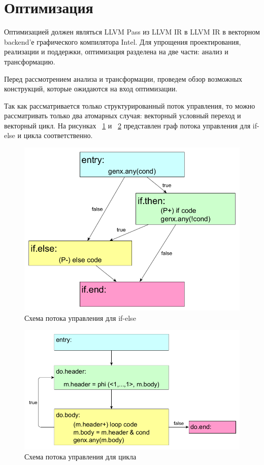 \section{Оптимизация}
\label{sec:Optimization}

Оптимизацией должен являться LLVM Pass из LLVM IR в LLVM IR в векторном
backend'е графического компилятора Intel. Для упрощения проектирования,
реализации и поддержки, оптимизация разделена на две части: анализ и
трансформацию.

Перед рассмотрением анализа и трансформации, проведем обзор возможных
конструкций, которые ожидаются на вход оптимизации.

Так как рассматривается только структурированный поток управления, то можно
рассматривать только два атомарных случая: векторный условный переход и
векторный цикл. На рисунках ~\ref{fig:if-else-simdcf-simple} и
~\ref{fig:loop-simdcf-simple} представлен граф потока управления для if-else и
цикла соответственно.
\begin{figure}
  \centering
  \includegraphics[scale=0.27]{Images/if-else-FE-colored.png}
  \caption{Схема потока управления для if-else}
  \label{fig:if-else-simdcf-simple}
\end{figure}
\begin{figure}
  \centering
  \includegraphics[scale=0.27]{Images/do-while-FE-colored.png}
  \caption{Схема потока управления для цикла}
  \label{fig:loop-simdcf-simple}
\end{figure}

